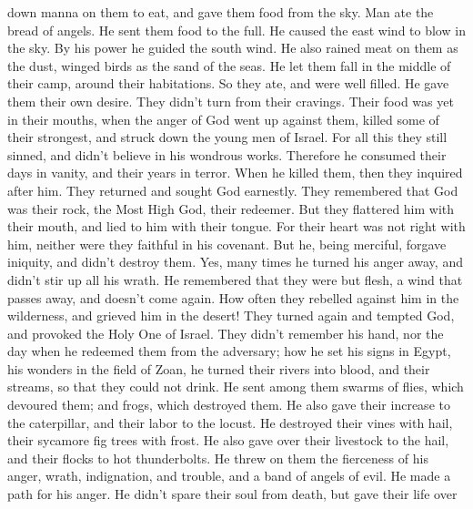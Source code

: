 down manna on them to eat, and gave them food from the sky.
 Man ate the bread of angels. He sent them food to the
full.  He caused the east wind to blow in the sky. By his
power he guided the south wind.  He also rained meat on
them as the dust, winged birds as the sand of the seas. 
He let them fall in the middle of their camp, around their habitations.
 So they ate, and were well filled. He gave them their
own desire.  They didn't turn from their cravings. Their
food was yet in their mouths,  when the anger of God went
up against them, killed some of their strongest, and struck down the
young men of Israel.  For all this they still sinned, and
didn't believe in his wondrous works.  Therefore he
consumed their days in vanity, and their years in terror.
 When he killed them, then they inquired after him. They
returned and sought God earnestly.  They remembered that
God was their rock, the Most High God, their redeemer. 
But they flattered him with their mouth, and lied to him with their
tongue.  For their heart was not right with him, neither
were they faithful in his covenant.  But he, being
merciful, forgave iniquity, and didn't destroy them. Yes, many times he
turned his anger away, and didn't stir up all his wrath. 
He remembered that they were but flesh, a wind that passes away, and
doesn't come again.  How often they rebelled against him
in the wilderness, and grieved him in the desert!  They
turned again and tempted God, and provoked the Holy One of Israel.
 They didn't remember his hand, nor the day when he
redeemed them from the adversary;  how he set his signs
in Egypt, his wonders in the field of Zoan,  he turned
their rivers into blood, and their streams, so that they could not
drink.  He sent among them swarms of flies, which
devoured them; and frogs, which destroyed them.  He also
gave their increase to the caterpillar, and their labor to the locust.
 He destroyed their vines with hail, their sycamore fig
trees with frost.  He also gave over their livestock to
the hail, and their flocks to hot thunderbolts.  He threw
on them the fierceness of his anger, wrath, indignation, and trouble,
and a band of angels of evil.  He made a path for his
anger. He didn't spare their soul from death, but gave their life over
